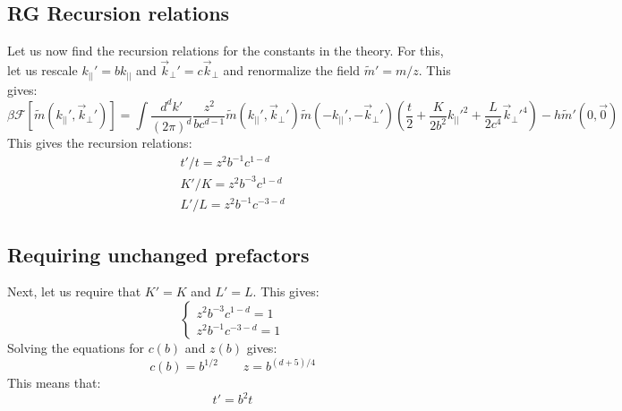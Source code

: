 \documentclass{article}
\begin{document}
\subsection{RG Recursion relations}
Let us now find the recursion relations for the constants in the theory. For this, let us rescale $k_{||}' = bk_{||}$ and $\vec{k}_{\perp}' = c\vec{k}_{\perp}$ and renormalize the field $\tilde{m}' = m/z$. This gives:
\begin{equation}
    \beta \mathcal{F}[\tilde{m}(k_{||}', \vec{k}_{\perp}')] = \int \frac{d^dk'}{(2\pi)^d}\frac{z^2}{bc^{d-1}}
    \tilde{m}(k_{||}', \vec{k}_{\perp}')\tilde{m}(-k_{||}', -\vec{k}_{\perp}')
    \left(
        \frac{t}{2} + \frac{K}{2b^2}k_{||}'^2 + \frac{L}{2c^4}\vec{k}_{\perp}'^4
    \right) - h\tilde{m}'(0, \vec{0})
\end{equation}
This gives the recursion relations:
\begin{equation}
\begin{gathered}
    t'/t = z^2b^{-1}c^{1-d}
    \\
    K'/K = z^2b^{-3}c^{1-d}
    \\
    L'/L = z^2b^{-1}c^{-3-d}
\end{gathered}
\end{equation}
\subsection{Requiring unchanged prefactors}
Next, let us require that $K' = K$ and $L' = L$. This gives:
\begin{equation}
\begin{cases}
    z^2b^{-3}c^{1-d} = 1
    \\
    z^2b^{-1}c^{-3-d} = 1
\end{cases}
\end{equation}
Solving the equations for $c(b)$ and $z(b)$ gives:
\begin{equation}
    c(b) = b^{1/2}
    \qquad
    z = b^{(d + 5)/4}
\end{equation}
This means that:
\begin{equation}
    t' = b^2t
\end{equation}
\end{document}

